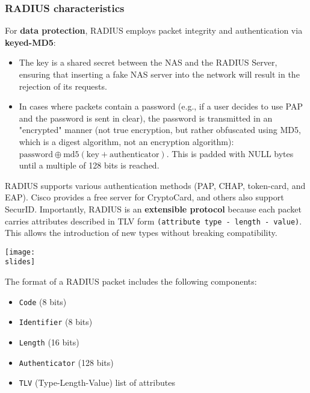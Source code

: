 \subsubsection{RADIUS characteristics}
For \textbf{data protection}, RADIUS employs packet integrity and authentication via \textbf{keyed-MD5}:

\begin{itemize}
    \item The key is a shared secret between the NAS and the RADIUS Server, ensuring that inserting a fake NAS server into the network will result in the rejection of its requests.
    \item In cases where packets contain a password (e.g., if a user decides to use PAP and the password is sent in clear), the password is transmitted in an "encrypted" manner (not true encryption, but rather obfuscated using MD5, which is a digest algorithm, not an encryption algorithm): \( \text{{password}} \oplus \text{{md5}}(\text{{key}} + \text{{authenticator}}) \). This is padded with NULL bytes until a multiple of 128 bits is reached.
\end{itemize}

RADIUS supports various authentication methods (PAP, CHAP, token-card, and EAP). Cisco provides a free server for CryptoCard, and others also support SecurID. Importantly, RADIUS is an \textbf{extensible protocol} because each packet carries attributes described in TLV form \texttt{(attribute type - length - value)}. This allows the introduction of new types without breaking compatibility.


\vspace*{5mm}
\noindent
\begin{minipage}{0.5\textwidth}
  \centering
  \texttt{[image: \\slides]}
\end{minipage}
\hspace{0.05\textwidth}
\begin{minipage}{0.4\textwidth}

    The format of a RADIUS packet includes the following components:
    \begin{itemize}
        \item \texttt{Code} (8 bits)
        \item \texttt{Identifier} (8 bits)
        \item \texttt{Length} (16 bits)
        \item \texttt{Authenticator} (128 bits)
        \item \texttt{TLV} (Type-Length-Value) list of attributes
    \end{itemize}  
\end{minipage}

